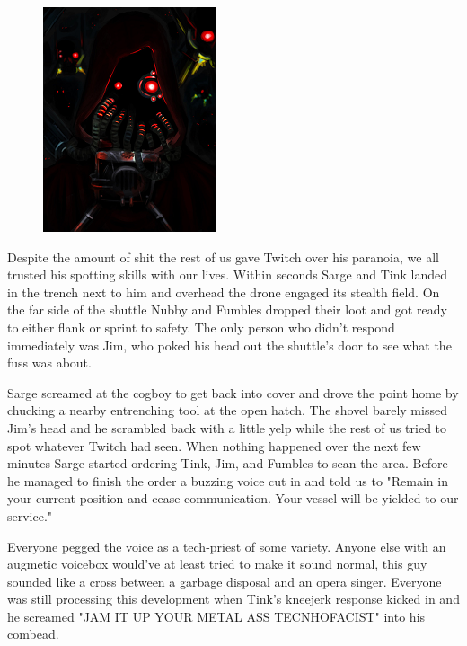 \begin{figure}
	\begin{center}
		\includegraphics[width=\figwidth]{pics/11/17.png}
	\end{center}
\end{figure}
Despite the amount of shit the rest of us gave Twitch over his paranoia, we all trusted his spotting skills with our lives. 
Within seconds Sarge and Tink landed in the trench next to him and overhead the drone engaged its stealth field. 
On the far side of the shuttle Nubby and Fumbles dropped their loot and got ready to either flank or sprint to safety. 
The only person who didn't respond immediately was Jim, who poked his head out the shuttle's door to see what the fuss was about.

Sarge screamed at the cogboy to get back into cover and drove the point home by chucking a nearby entrenching tool at the open hatch. 
The shovel barely missed Jim's head and he scrambled back with a little yelp while the rest of us tried to spot whatever Twitch had seen. 
When nothing happened over the next few minutes Sarge started ordering Tink, Jim, and Fumbles to scan the area. 
Before he managed to finish the order a buzzing voice cut in and told us to "Remain in your current position and cease communication. 
Your vessel will be yielded to our service."

Everyone pegged the voice as a tech-priest of some variety. 
Anyone else with an augmetic voicebox would've at least tried to make it sound normal, this guy sounded like a cross between a garbage disposal and an opera singer. 
Everyone was still processing this development when Tink's kneejerk response kicked in and he screamed "JAM IT UP YOUR METAL ASS TECNHOFACIST" into his combead. 


